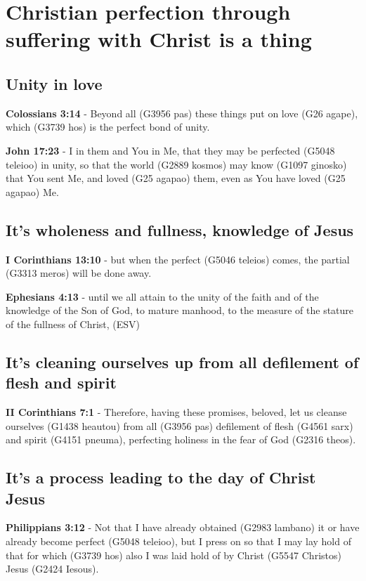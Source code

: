 \documentclass[11pt]{article}
\begin{document}
\section{Christian perfection through suffering with Christ is a thing}
\label{sec:org3914399}
\subsection{Unity in love}
\label{sec:org24660a0}
\textbf{Colossians 3:14} - Beyond all (G3956 pas) these things put on love (G26 agape), which (G3739 hos) is the perfect bond of unity.

\textbf{John 17:23} - I in them and You in Me, that they may be perfected (G5048 teleioo) in unity, so that the world (G2889 kosmos) may know (G1097 ginosko) that You sent Me, and loved (G25 agapao) them, even as You have loved (G25 agapao) Me.

\subsection{It's wholeness and fullness, knowledge of Jesus}
\label{sec:org8f8980b}
\textbf{I Corinthians 13:10} - but when the perfect (G5046 teleios) comes, the partial (G3313 meros) will be done away.

\textbf{Ephesians 4:13} - until we all attain to the unity of the faith and of the knowledge of the Son of God, to mature manhood, to the measure of the stature of the fullness of Christ, (ESV)

\subsection{It's cleaning ourselves up from all defilement of flesh and spirit}
\label{sec:org56a39ac}
\textbf{II Corinthians 7:1} - Therefore, having these promises, beloved, let us cleanse ourselves (G1438 heautou) from all (G3956 pas) defilement of flesh (G4561 sarx) and spirit (G4151 pneuma), perfecting holiness in the fear of God (G2316 theos).

\subsection{It's a process leading to the day of Christ Jesus}
\label{sec:org1bb9199}
\textbf{Philippians 3:12} - Not that I have already obtained (G2983 lambano) it or have already become perfect (G5048 teleioo), but I press on so that I may lay hold of that for which (G3739 hos) also I was laid hold of by Christ (G5547 Christos) Jesus (G2424 Iesous).
\end{document}
